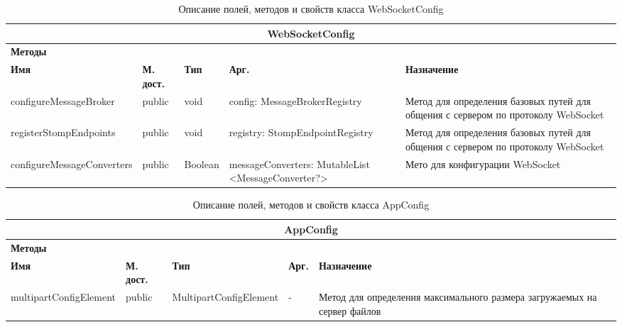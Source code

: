 \documentclass{../includes/TechDoc}
\begin{document}
    \begin{table}[h]
        \caption{\label{tab:class-WebSocketConfig-table}Описание полей, методов и свойств класса WebSocketConfig}
        \begin{tabularx}{\textwidth}{|l|l|l|p{4.3cm}|X|}
            \hline
            \multicolumn{5}{|c|}{WebSocketConfig} \\ \hline
            \multicolumn{5}{|l|}{\textbf{Методы}} \\ \hline
            \textbf{Имя}   & \textbf{М. дост.} & \textbf{Тип} & \textbf{Арг.} & \textbf{Назначение}                      \\ \hline
            configureMessageBroker   & public            & void         & config: MessageBrokerRegistry    & Метод для определения базовых путей для общения с сервером по протоколу WebSocket      \\ \hline
            registerStompEndpoints   & public            & void         & registry: StompEndpointRegistry    & Метод для определения базовых путей для общения с сервером по протоколу WebSocket      \\ \hline
            configureMessageConverters   & public            & Boolean         & messageConverters: MutableList <MessageConverter?>    & Мето для конфигурации WebSocket      \\ \hline
        \end{tabularx}
    \end{table}

    \begin{table}[h]
        \caption{\label{tab:class-AppConfig-table}Описание полей, методов и свойств класса AppConfig}
        \begin{tabularx}{\textwidth}{|l|l|l|l|X|}
            \hline
            \multicolumn{5}{|c|}{AppConfig} \\ \hline
            \multicolumn{5}{|l|}{\textbf{Методы}} \\ \hline
            \textbf{Имя}   & \textbf{М. дост.} & \textbf{Тип} & \textbf{Арг.} & \textbf{Назначение}                      \\ \hline
            multipartConfigElement   & public            & MultipartConfigElement         & -    & Метод для определения максимального размера загружаемых на сервер файлов      \\ \hline
        \end{tabularx}
    \end{table}
\end{document}
